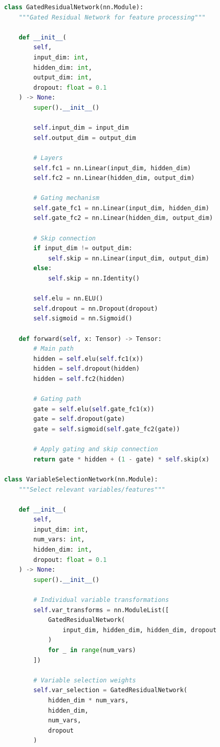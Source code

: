 \begin{lstlisting}[language=Python, caption=Temporal Fusion Transformer Components]
class GatedResidualNetwork(nn.Module):
    """Gated Residual Network for feature processing"""

    def __init__(
        self,
        input_dim: int,
        hidden_dim: int,
        output_dim: int,
        dropout: float = 0.1
    ) -> None:
        super().__init__()

        self.input_dim = input_dim
        self.output_dim = output_dim

        # Layers
        self.fc1 = nn.Linear(input_dim, hidden_dim)
        self.fc2 = nn.Linear(hidden_dim, output_dim)

        # Gating mechanism
        self.gate_fc1 = nn.Linear(input_dim, hidden_dim)
        self.gate_fc2 = nn.Linear(hidden_dim, output_dim)

        # Skip connection
        if input_dim != output_dim:
            self.skip = nn.Linear(input_dim, output_dim)
        else:
            self.skip = nn.Identity()

        self.elu = nn.ELU()
        self.dropout = nn.Dropout(dropout)
        self.sigmoid = nn.Sigmoid()

    def forward(self, x: Tensor) -> Tensor:
        # Main path
        hidden = self.elu(self.fc1(x))
        hidden = self.dropout(hidden)
        hidden = self.fc2(hidden)

        # Gating path
        gate = self.elu(self.gate_fc1(x))
        gate = self.dropout(gate)
        gate = self.sigmoid(self.gate_fc2(gate))

        # Apply gating and skip connection
        return gate * hidden + (1 - gate) * self.skip(x)

class VariableSelectionNetwork(nn.Module):
    """Select relevant variables/features"""

    def __init__(
        self,
        input_dim: int,
        num_vars: int,
        hidden_dim: int,
        dropout: float = 0.1
    ) -> None:
        super().__init__()

        # Individual variable transformations
        self.var_transforms = nn.ModuleList([
            GatedResidualNetwork(
                input_dim, hidden_dim, hidden_dim, dropout
            )
            for _ in range(num_vars)
        ])

        # Variable selection weights
        self.var_selection = GatedResidualNetwork(
            hidden_dim * num_vars,
            hidden_dim,
            num_vars,
            dropout
        )


\end{lstlisting}
